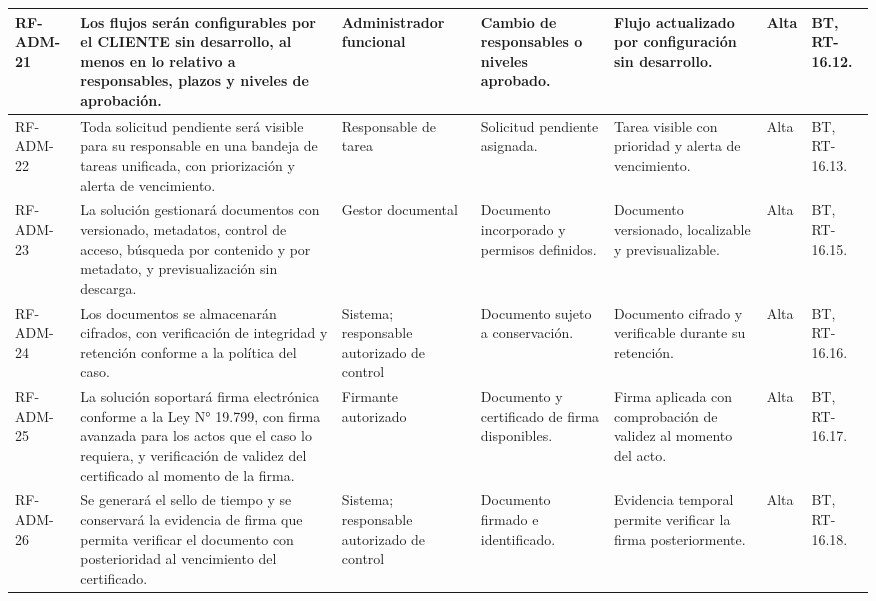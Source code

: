 \begin{longtable}{|L{0.080645\AnchoTablaAnexo}|L{0.262097\AnchoTablaAnexo}|L{0.100806\AnchoTablaAnexo}|L{0.145161\AnchoTablaAnexo}|L{0.173387\AnchoTablaAnexo}|L{0.060484\AnchoTablaAnexo}|L{0.177420\AnchoTablaAnexo}|}
RF-\allowbreak{}ADM-\allowbreak{}21 &
Los flujos serán configurables por el CLIENTE sin desarrollo, al menos en lo relativo a responsables, plazos y niveles de aprobación. &
Administrador funcional &
Cambio de responsables o niveles aprobado. &
Flujo actualizado por configuración sin desarrollo. &
Alta &
BT, RT-16.12. \\ \hline

RF-\allowbreak{}ADM-\allowbreak{}22 &
Toda solicitud pendiente será visible para su responsable en una bandeja de tareas unificada, con priorización y alerta de vencimiento. &
Responsable de tarea &
Solicitud pendiente asignada. &
Tarea visible con prioridad y alerta de vencimiento. &
Alta &
BT, RT-16.13. \\ \hline

RF-\allowbreak{}ADM-\allowbreak{}23 &
La solución gestionará documentos con versionado, metadatos, control de acceso, búsqueda por contenido y por metadato, y previsualización sin descarga. &
Gestor documental &
Documento incorporado y permisos definidos. &
Documento versionado, localizable y previsualizable. &
Alta &
BT, RT-16.15. \\ \hline

RF-\allowbreak{}ADM-\allowbreak{}24 &
Los documentos se almacenarán cifrados, con verificación de integridad y retención conforme a la política del caso. &
Sistema; responsable autorizado de control &
Documento sujeto a conservación. &
Documento cifrado y verificable durante su retención. &
Alta &
BT, RT-16.16. \\ \hline

RF-\allowbreak{}ADM-\allowbreak{}25 &
La solución soportará firma electrónica conforme a la Ley N° 19.799, con firma avanzada para los actos que el caso lo requiera, y verificación de validez del certificado al momento de la firma. &
Firmante autorizado &
Documento y certificado de firma disponibles. &
Firma aplicada con comprobación de validez al momento del acto. &
Alta &
BT, RT-16.17. \\ \hline

RF-\allowbreak{}ADM-\allowbreak{}26 &
Se generará el sello de tiempo y se conservará la evidencia de firma que permita verificar el documento con posterioridad al vencimiento del certificado. &
Sistema; responsable autorizado de control &
Documento firmado e identificado. &
Evidencia temporal permite verificar la firma posteriormente. &
Alta &
BT, RT-16.18. \\ \hline


\end{longtable}
